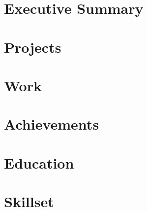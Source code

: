 \documentclass[12pt, a4paper, sans, obeyspaces, unicode]{moderncv}
\begin{document}
\maketitle

\vspace{0.5cm}

\section{Executive Summary}


\section{Projects}


\section{Work}


\newpage

\section{Achievements}


\section{Education}


\section{Skillset}

\end{document}
